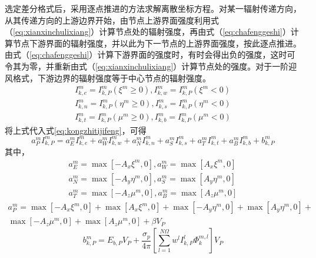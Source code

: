 选定差分格式后，采用逐点推进的方法求解离散坐标方程。对某一辐射传递方向，从其传递方向的上游边界开始，由节点上游界面强度利用式（\ref{eq:xianxinchulixiang}）计算节点处的辐射强度，再由式（\ref{eq:chafenggeshi}）计算节点下游界面的辐射强度，并以此为下一节点的上游界面强度，按此逐点推进。由式（\ref{eq:chafenggeshi}）计算下游界面的强度时，有时会得出负的强度，这时可令其为零，并重新由式（\ref{eq:xianxinchulixiang}）计算节点处的强度。对于一阶迎风格式，下游边界的辐射强度等于中心节点的辐射强度。
\begin{equation}
\begin{array}{l}
I_{k,e}^m = I_{k,P}^m({\xi ^m} \ge 0),I_{k,w}^m = I_{k,P}^m({\xi ^m} < 0)\\
I_{k,n}^m = I_{k,P}^m({\eta ^m} \ge 0),I_{k,s}^m = I_{k,P}^m({\eta ^m} < 0)\\
I_{k,t}^m = I_{k,P}^m({\mu ^m} \ge 0),I_{k,b}^m = I_{k,P}^m({\mu ^m} < 0)
\end{array}
\end{equation}
将上式代入式\ref{eq:kongzhitijifeng}，可得
\begin{equation}
a_P^mI_{k,P}^m = a_E^mI_{k,e}^m + a_W^mI_{k,w}^m + a_N^mI_{k,n}^m + a_S^mI_{k,s}^m + a_T^mI_{k,t}^m + a_B^mI_{k,b}^m + b_{k,P}^m
\end{equation}
其中，
\begin{equation}
\begin{array}{l}
a_E^m = \max [ - {A_x}{\xi ^m},0],a_W^m = \max [{A_x}{\xi ^m},0]\\
a_N^m = \max [ - {A_y}{\eta ^m},0],a_S^m = \max [{A_y}{\eta ^m},0]\\
a_T^m = \max [ - {A_z}{\mu ^m},0],a_B^m = \max [{A_z}{\mu ^m},0]
\end{array}
\end{equation}
\begin{equation}
\begin{array}{l}
a_P^m = \max [ - {A_x}{\xi ^m},0] + \max [{A_x}{\xi ^m},0] + \max [ - {A_y}{\eta ^m},0] + \max [{A_y}{\eta ^m},0] + \\
\max [ - {A_z}{\mu ^m},0] + \max [{A_z}{\mu ^m},0] + \beta {V_P}
\end{array}
\end{equation}
\begin{equation}
b_{k,P}^m = {E_{b,P}}{V_P} + \frac{{{\sigma _p}}}{{4\pi }}[\sum\limits_{l = 1}^{N\Omega } {{w^l}I_{k,P}^l\Phi _k^{m,l}} ]{V_P}
\end{equation}
